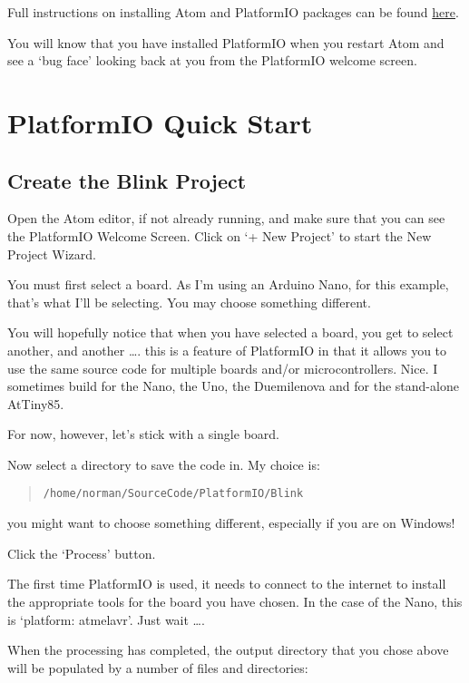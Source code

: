 Full instructions on installing Atom and PlatformIO packages can be
found
\href{http://docs.platformio.org/en/latest/ide/atom.html\#clang-for-intelligent-code-completion}{here}.

You will know that you have installed PlatformIO when you restart Atom
and see a `bug face' looking back at you from the PlatformIO welcome
screen.

\section{PlatformIO Quick Start}\label{platformio-quick-start}

\subsection{Create the Blink Project}\label{create-the-blink-project}

Open the Atom editor, if not already running, and make sure that you can
see the PlatformIO Welcome Screen. Click on `+ New Project' to start the
New Project Wizard.

You must first select a board. As I'm using an Arduino Nano, for this
example, that's what I'll be selecting. You may choose something
different.

You will hopefully notice that when you have selected a board, you get
to select another, and another \ldots{}. this is a feature of PlatformIO
in that it allows you to use the same source code for multiple boards
and/or microcontrollers. Nice. I sometimes build for the Nano, the Uno,
the Duemilenova and for the stand-alone AtTiny85.

For now, however, let's stick with a single board.

Now select a directory to save the code in. My choice is:

\begin{quote}
\lstinline!/home/norman/SourceCode/PlatformIO/Blink!
\end{quote}

you might want to choose something different, especially if you are on
Windows!

Click the `Process' button.

The first time PlatformIO is used, it needs to connect to the internet
to install the appropriate tools for the board you have chosen. In the
case of the Nano, this is `platform: atmelavr'. Just wait \ldots{}.

When the processing has completed, the output directory that you chose
above will be populated by a number of files and directories:

